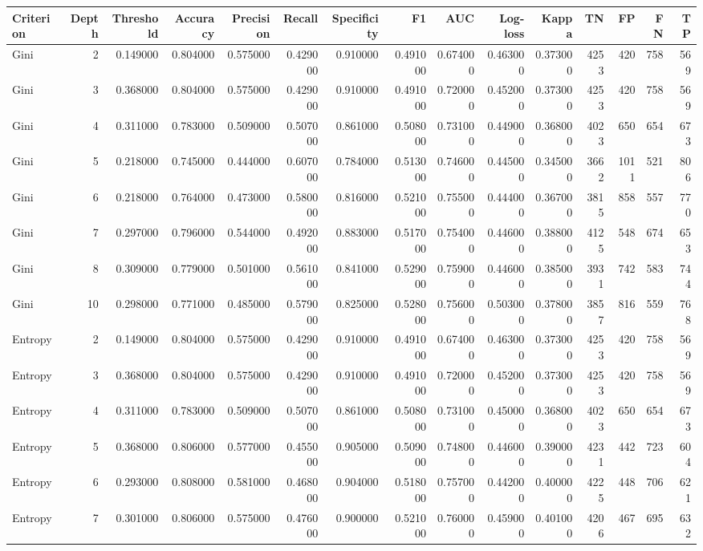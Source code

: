 \begin{tabular}{lrrrrrrrrrrrrrr}
\toprule
Criterion & Depth & Threshold & Accuracy & Precision & Recall & Specificity & F1 & AUC & Log-loss & Kappa & TN & FP & FN & TP \\
\midrule
Gini & 2 & 0.149000 & 0.804000 & 0.575000 & 0.429000 & 0.910000 & 0.491000 & 0.674000 & 0.463000 & 0.373000 & 4253 & 420 & 758 & 569 \\
Gini & 3 & 0.368000 & 0.804000 & 0.575000 & 0.429000 & 0.910000 & 0.491000 & 0.720000 & 0.452000 & 0.373000 & 4253 & 420 & 758 & 569 \\
Gini & 4 & 0.311000 & 0.783000 & 0.509000 & 0.507000 & 0.861000 & 0.508000 & 0.731000 & 0.449000 & 0.368000 & 4023 & 650 & 654 & 673 \\
Gini & 5 & 0.218000 & 0.745000 & 0.444000 & 0.607000 & 0.784000 & 0.513000 & 0.746000 & 0.445000 & 0.345000 & 3662 & 1011 & 521 & 806 \\
Gini & 6 & 0.218000 & 0.764000 & 0.473000 & 0.580000 & 0.816000 & 0.521000 & 0.755000 & 0.444000 & 0.367000 & 3815 & 858 & 557 & 770 \\
Gini & 7 & 0.297000 & 0.796000 & 0.544000 & 0.492000 & 0.883000 & 0.517000 & 0.754000 & 0.446000 & 0.388000 & 4125 & 548 & 674 & 653 \\
Gini & 8 & 0.309000 & 0.779000 & 0.501000 & 0.561000 & 0.841000 & 0.529000 & 0.759000 & 0.446000 & 0.385000 & 3931 & 742 & 583 & 744 \\
Gini & 10 & 0.298000 & 0.771000 & 0.485000 & 0.579000 & 0.825000 & 0.528000 & 0.756000 & 0.503000 & 0.378000 & 3857 & 816 & 559 & 768 \\
Entropy & 2 & 0.149000 & 0.804000 & 0.575000 & 0.429000 & 0.910000 & 0.491000 & 0.674000 & 0.463000 & 0.373000 & 4253 & 420 & 758 & 569 \\
Entropy & 3 & 0.368000 & 0.804000 & 0.575000 & 0.429000 & 0.910000 & 0.491000 & 0.720000 & 0.452000 & 0.373000 & 4253 & 420 & 758 & 569 \\
Entropy & 4 & 0.311000 & 0.783000 & 0.509000 & 0.507000 & 0.861000 & 0.508000 & 0.731000 & 0.450000 & 0.368000 & 4023 & 650 & 654 & 673 \\
Entropy & 5 & 0.368000 & 0.806000 & 0.577000 & 0.455000 & 0.905000 & 0.509000 & 0.748000 & 0.446000 & 0.390000 & 4231 & 442 & 723 & 604 \\
Entropy & 6 & 0.293000 & 0.808000 & 0.581000 & 0.468000 & 0.904000 & 0.518000 & 0.757000 & 0.442000 & 0.400000 & 4225 & 448 & 706 & 621 \\
Entropy & 7 & 0.301000 & 0.806000 & 0.575000 & 0.476000 & 0.900000 & 0.521000 & 0.760000 & 0.459000 & 0.401000 & 4206 & 467 & 695 & 632 \\

\end{tabular}

